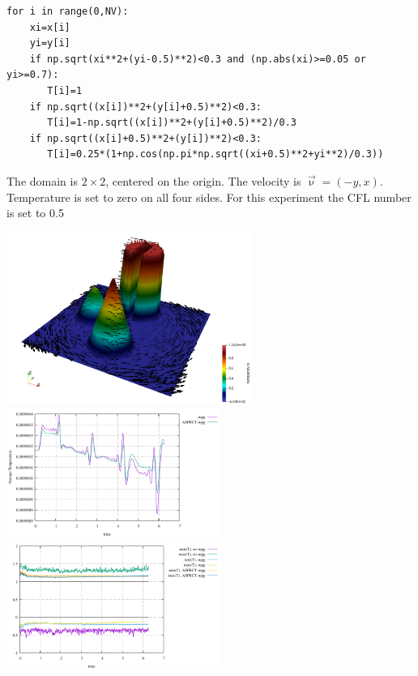 \begin{lstlisting}
for i in range(0,NV):
    xi=x[i]
    yi=y[i]
    if np.sqrt(xi**2+(yi-0.5)**2)<0.3 and (np.abs(xi)>=0.05 or yi>=0.7):
       T[i]=1
    if np.sqrt((x[i])**2+(y[i]+0.5)**2)<0.3:
       T[i]=1-np.sqrt((x[i])**2+(y[i]+0.5)**2)/0.3
    if np.sqrt((x[i]+0.5)**2+(y[i])**2)<0.3:
       T[i]=0.25*(1+np.cos(np.pi*np.sqrt((xi+0.5)**2+yi**2)/0.3))
\end{lstlisting}

The domain is $2\times2$, centered on the origin. The velocity is $\vec\upnu=(-y,x)$. Temperature 
is set to zero on all four sides.
For this experiment the CFL number is set to 0.5

\begin{center}
\includegraphics[width=8cm]{python_codes/fieldstone_43/results/experiment2/buildings}\\
\includegraphics[width=7cm]{python_codes/fieldstone_43/results/experiment2/avrg_T}
\includegraphics[width=7cm]{python_codes/fieldstone_43/results/experiment2/stats_T}
\end{center}

